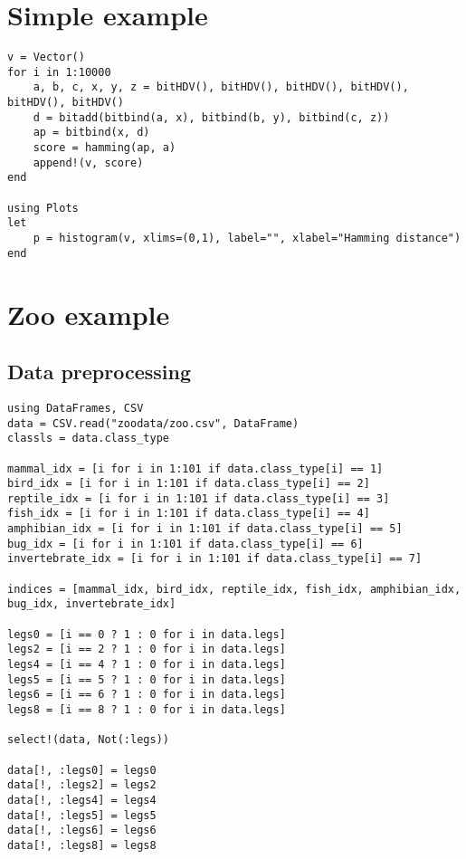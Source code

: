 \section{Simple example}
\begin{verbatim}
v = Vector()
for i in 1:10000
    a, b, c, x, y, z = bitHDV(), bitHDV(), bitHDV(), bitHDV(), bitHDV(), bitHDV()
    d = bitadd(bitbind(a, x), bitbind(b, y), bitbind(c, z))
    ap = bitbind(x, d)
    score = hamming(ap, a)
    append!(v, score)
end

using Plots
let
	p = histogram(v, xlims=(0,1), label="", xlabel="Hamming distance")
end
\end{verbatim}
\section{Zoo example}
\subsection{Data preprocessing}
\begin{verbatim}
using DataFrames, CSV
data = CSV.read("zoodata/zoo.csv", DataFrame)
classls = data.class_type

mammal_idx = [i for i in 1:101 if data.class_type[i] == 1]
bird_idx = [i for i in 1:101 if data.class_type[i] == 2]
reptile_idx = [i for i in 1:101 if data.class_type[i] == 3]
fish_idx = [i for i in 1:101 if data.class_type[i] == 4]
amphibian_idx = [i for i in 1:101 if data.class_type[i] == 5]
bug_idx = [i for i in 1:101 if data.class_type[i] == 6]
invertebrate_idx = [i for i in 1:101 if data.class_type[i] == 7]

indices = [mammal_idx, bird_idx, reptile_idx, fish_idx, amphibian_idx, bug_idx, invertebrate_idx]

legs0 = [i == 0 ? 1 : 0 for i in data.legs]
legs2 = [i == 2 ? 1 : 0 for i in data.legs]
legs4 = [i == 4 ? 1 : 0 for i in data.legs]
legs5 = [i == 5 ? 1 : 0 for i in data.legs]
legs6 = [i == 6 ? 1 : 0 for i in data.legs]
legs8 = [i == 8 ? 1 : 0 for i in data.legs]

select!(data, Not(:legs))

data[!, :legs0] = legs0
data[!, :legs2] = legs2
data[!, :legs4] = legs4
data[!, :legs5] = legs5
data[!, :legs6] = legs6
data[!, :legs8] = legs8
\end{verbatim}
